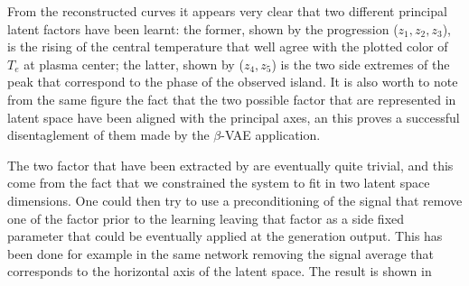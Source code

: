 From the reconstructed curves it appears very clear that two different principal latent factors have been learnt: the former, shown by the progression ($z_1, z_2, z_3$), is the rising of the central temperature that well agree with the plotted color of $T_e$ at plasma center; the latter, shown by ($z_4, z_5$) is the two side extremes of the peak that correspond to the phase of the observed island.
It is also worth to note from the same figure the fact that the two possible factor that are represented in latent space have been aligned with the principal axes, an this proves a successful disentaglement of them made by the $\beta$-VAE application. 

The two factor that have been extracted by  are eventually quite trivial, and this come from the fact that we constrained the system to fit in two latent space dimensions. One could then try to use a preconditioning of the signal that remove one of the factor prior to the learning leaving that factor as a side fixed parameter that could be eventually applied at the generation output. This has been done for example in the same network removing the signal average that corresponds to the horizontal axis of the latent space.
The result is shown in~\Figure{\ref{fig:VAE2_qsh_ls_preconditioned}}
